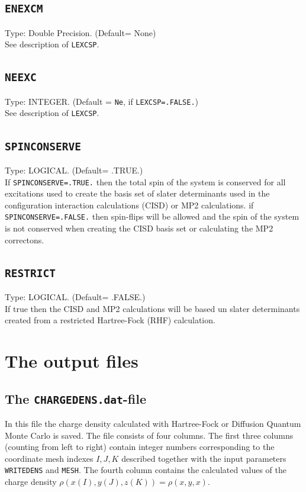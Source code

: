 \documentclass[a4paper,twoside,openany]{book}
\begin{document}
{{\subsection{\texttt{ENEXCM}}
Type: Double Precision. (Default= None)\\
See description of \texttt{LEXCSP}.

\subsection{\texttt{NEEXC}}
Type: INTEGER. (Default = \texttt{Ne}, if  \texttt{LEXCSP=.FALSE.})\\
See description of \texttt{LEXCSP}.

\subsection{\texttt{SPINCONSERVE}}
Type:  LOGICAL. (Default= .TRUE.)\\
If \texttt{SPINCONSERVE=.TRUE.} then the total spin of the system is conserved for all excitations used to create the basis set of slater determinants used in the configuration interaction calculations (CISD)
or MP2 calculations. if \texttt{SPINCONSERVE=.FALSE.} then spin-flips will be allowed and the spin of the system is not conserved when creating the CISD basis set or calculating the MP2 correctons.

\subsection{\texttt{RESTRICT}}
Type:  LOGICAL. (Default= .FALSE.)\\
If true then the CISD and MP2 calculations will be based un slater determinants created from a restricted Hartree-Fock (RHF) calculation.

\section{The output files}

\subsection{The \texttt{CHARGEDENS.dat}-file}
In this file the charge density calculated with Hartree-Fock or Diffusion Quantum Monte Carlo is saved. The file consists of four columns. The first three columns (counting from left to right) 
contain integer numbers corresponding to the coordinate mesh indexes $I,J,K$ described together with the input parameters \texttt{WRITEDENS} and \texttt{MESH}. The fourth column 
contains the calculated values of the charge density $\rho(x(I),y(J),z(K)) = \rho(x,y,x)$.

}}
\end{document}
